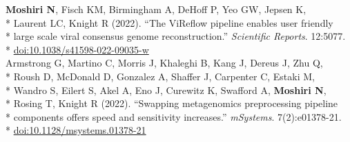 \documentclass[margin,line]{res}
\begin{document}
\begin{resume}
\hspace*{4mm} \textbf{Moshiri N}, Fisch KM, Birmingham A, DeHoff P, Yeo GW, Jepsen K,\\*
\hspace*{9.5mm} Laurent LC, Knight R (2022). ``The ViReflow pipeline enables user friendly\\*
\hspace*{9.5mm} large scale viral consensus genome reconstruction.'' \textit{Scientific Reports}. 12:5077.\\*\vspace{2mm}
\hspace*{8mm} \href{https://doi.org/10.1038/s41598-022-09035-w}{doi:10.1038/s41598-022-09035-w}\\
\hspace*{4mm} Armstrong G, Martino C, Morris J, Khaleghi B, Kang J, Dereus J, Zhu Q,\\*
\hspace*{9.5mm} Roush D, McDonald D, Gonzalez A, Shaffer J, Carpenter C, Estaki M,\\*
\hspace*{9.5mm} Wandro S, Eilert S, Akel A, Eno J, Curewitz K, Swafford A, \textbf{Moshiri N},\\*
\hspace*{9.5mm} Rosing T, Knight R (2022). ``Swapping metagenomics preprocessing pipeline\\*
\hspace*{9.5mm} components offers speed and sensitivity increases.'' \textit{mSystems}. 7(2):e01378-21.\\*\vspace{2mm}
\hspace*{8mm} \href{https://doi.org/10.1128/msystems.01378-21}{doi:10.1128/msystems.01378-21}\\

\end{resume}
\end{document}
